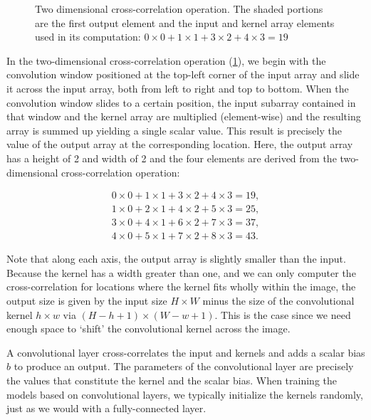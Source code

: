 \begin{figure}[hpt]
	\centering
	
	\caption{Two dimensional cross-correlation operation. The shaded portions are the first output element and the input and kernel array elements used in its computation: $0 \times 0+1 \times 1+3 \times 2+4 \times 3=19$}
	\label{fig:correlation}
\end{figure}

In the two-dimensional cross-correlation operation (\cref{fig:correlation}), we begin with the convolution window positioned at the top-left corner of the input array and slide it across the input array, both from left to right and top to bottom. When the convolution window slides to a certain position, the input subarray contained in that window and the kernel array are multiplied (element-wise) and the resulting array is summed up yielding a single scalar value. This result is precisely the value of the output array at the corresponding location. Here, the output array has a height of 2 and width of 2 and the four elements are derived from the two-dimensional cross-correlation operation:

\begin{align*}
0 \times 0+1 \times 1+3 \times 2+4 \times 3=19,\\
1 \times 0+2 \times 1+4 \times 2+5 \times 3=25,\\
3 \times 0+4 \times 1+6 \times 2+7 \times 3=37,\\
4 \times 0+5 \times 1+7 \times 2+8 \times 3=43.
\end{align*}

Note that along each axis, the output array is slightly smaller than the input. Because the kernel has a width greater than one, and we can only computer the cross-correlation for locations where the kernel fits wholly within the image, the output size is given by the input size $H \times W$  minus the size of the convolutional kernel $h \times w$ via $(H-h+1)\times(W-w+1)$. This is the case since we need enough space to ‘shift’ the convolutional kernel across the image.

A convolutional layer cross-correlates the input and kernels and adds a scalar bias $b$ to produce an output. The parameters of the convolutional layer are precisely the values that constitute the kernel and the scalar bias. When training the models based on convolutional layers, we typically initialize the kernels randomly, just as we would with a fully-connected layer. 


